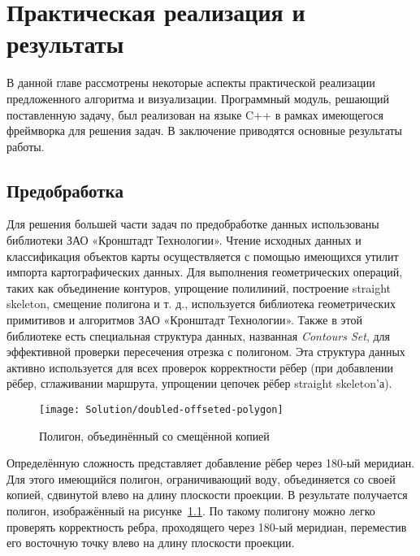 \chapter{Практическая реализация и результаты}

\label{ch:implementation}

В данной главе рассмотрены некоторые аспекты практической реализации
предложенного алгоритма и визуализации. Программный модуль, решающий
поставленную задачу, был реализован на языке C++ в рамках имеющегося
фреймворка для решения задач. В заключение приводятся основные
результаты работы.

\FloatBarrier

\section{Предобработка}

\label{sec:preprocessing-impl}

Для решения большей части задач по предобработке данных использованы
библиотеки ЗАО «Кронштадт Технологии». Чтение исходных данных и
классификация объектов карты осуществляется с помощью имеющихся утилит
импорта картографических данных. Для выполнения геометрических
операций, таких как объединение контуров, упрощение полилиний,
построение straight skeleton, смещение полигона и т. д., используется
библиотека геометрических примитивов и алгоритмов ЗАО «Кронштадт
Технологии». Также в этой библиотеке есть специальная структура
данных, названная \emph{Contours Set}, для эффективной проверки
пересечения отрезка с полигоном. Эта структура данных активно
используется для всех проверок корректности рёбер (при добавлении
рёбер, сглаживании маршрута, упрощении цепочек рёбер straight
skeleton'а).

\begin{figure}
    \texttt{[image: Solution/doubled-offseted-polygon]}
    \caption{Полигон, объединённый со смещённой копией}
    \label{fig:doubled-polygon}
\end{figure}

Определённую сложность представляет добавление рёбер через 180-ый
меридиан. Для этого имеющийся полигон, ограничивающий воду,
объединяется со своей копией, сдвинутой влево на длину плоскости
проекции. В результате получается полигон, изображённый на
рисунке~\ref{fig:doubled-polygon}. По такому полигону можно легко
проверять корректность ребра, проходящего через 180-ый меридиан,
переместив его восточную точку влево на длину плоскости проекции.

